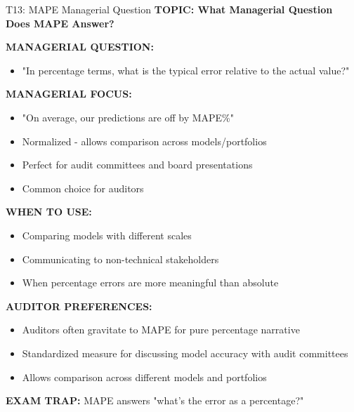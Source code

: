 \documentclass[8pt]{beamer}
\begin{document}
	\begin{frame}{T13: MAPE Managerial Question}
		\fontsize{6.5}{7.5}\selectfont
		\textbf{TOPIC: What Managerial Question Does MAPE Answer?}
		
		\vspace{0.1cm}
		\textbf{MANAGERIAL QUESTION:}
		\begin{itemize}
			\item "In percentage terms, what is the typical error relative to the actual value?"
		\end{itemize}
		
		\vspace{0.1cm}
		\textbf{MANAGERIAL FOCUS:}
		\begin{itemize}
			\item "On average, our predictions are off by MAPE\%"
			\item Normalized - allows comparison across models/portfolios
			\item Perfect for audit committees and board presentations
			\item Common choice for auditors
		\end{itemize}
		
		\vspace{0.1cm}
		\textbf{WHEN TO USE:}
		\begin{itemize}
			\item Comparing models with different scales
			\item Communicating to non-technical stakeholders
			\item When percentage errors are more meaningful than absolute
		\end{itemize}
		
		\vspace{0.1cm}
		\textbf{AUDITOR PREFERENCES:}
		\begin{itemize}
			\item Auditors often gravitate to MAPE for pure percentage narrative
			\item Standardized measure for discussing model accuracy with audit committees
			\item Allows comparison across different models and portfolios
		\end{itemize}
		
		\textcolor{myred}{\textbf{EXAM TRAP:}} MAPE answers \textcolor{myblue}{"what's the error as a percentage?"}
	\end{frame}
	
\end{document}
